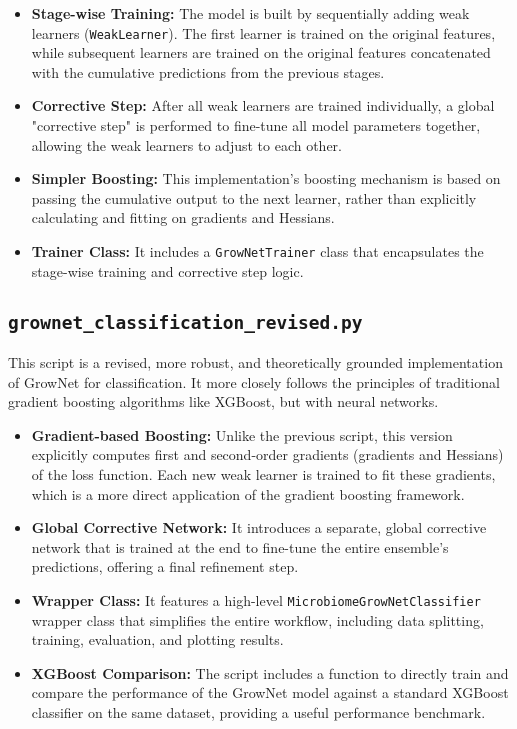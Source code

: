 \documentclass{article}
\begin{document}
\begin{itemize}
    \item \textbf{Stage-wise Training:} The model is built by sequentially adding weak learners (\texttt{WeakLearner}). The first learner is trained on the original features, while subsequent learners are trained on the original features concatenated with the cumulative predictions from the previous stages.
    \item \textbf{Corrective Step:} After all weak learners are trained individually, a global "corrective step" is performed to fine-tune all model parameters together, allowing the weak learners to adjust to each other.
    \item \textbf{Simpler Boosting:} This implementation's boosting mechanism is based on passing the cumulative output to the next learner, rather than explicitly calculating and fitting on gradients and Hessians.
    \item \textbf{Trainer Class:} It includes a \texttt{GrowNetTrainer} class that encapsulates the stage-wise training and corrective step logic.
\end{itemize}

\subsection*{\texttt{grownet\_classification\_revised.py}}
This script is a revised, more robust, and theoretically grounded implementation of GrowNet for classification. It more closely follows the principles of traditional gradient boosting algorithms like XGBoost, but with neural networks.

\begin{itemize}
    \item \textbf{Gradient-based Boosting:} Unlike the previous script, this version explicitly computes first and second-order gradients (gradients and Hessians) of the loss function. Each new weak learner is trained to fit these gradients, which is a more direct application of the gradient boosting framework.
    \item \textbf{Global Corrective Network:} It introduces a separate, global corrective network that is trained at the end to fine-tune the entire ensemble's predictions, offering a final refinement step.
    \item \textbf{Wrapper Class:} It features a high-level \texttt{MicrobiomeGrowNetClassifier} wrapper class that simplifies the entire workflow, including data splitting, training, evaluation, and plotting results.
    \item \textbf{XGBoost Comparison:} The script includes a function to directly train and compare the performance of the GrowNet model against a standard XGBoost classifier on the same dataset, providing a useful performance benchmark.
\end{itemize}
\end{document}
